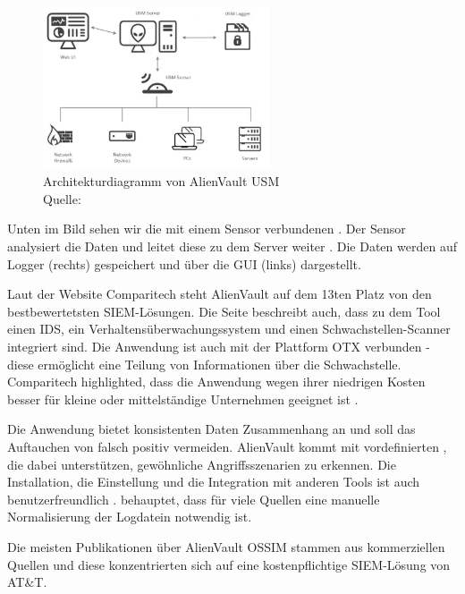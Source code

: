 \begin{figure}[H]
   \centering
   \includegraphics[width=0.6\textwidth]{assets/2_p6.png}
   \caption[Architekturdiagramm von AlienVault \gls{USM}]
   {Architekturdiagramm von AlienVault \gls{USM} \\Quelle: \citep{ATT_AVO} }
   \label{fig:AlienVault_Architektur}
   \centering
\end{figure}

Unten im Bild sehen wir die mit einem Sensor verbundenen . Der Sensor analysiert die Daten und leitet diese zu dem Server weiter \citep{AV_Sensor}. Die Daten werden auf Logger (rechts) gespeichert und über die \gls{GUI} (links) dargestellt. 

Laut der Website Comparitech steht AlienVault auf dem 13ten Platz von den bestbewertetsten \gls{SIEM}-Lösungen. Die Seite beschreibt auch, dass zu dem Tool einen \gls{IDS}, ein Verhaltensüberwachungssystem und einen Schwachstellen-Scanner integriert sind. Die Anwendung ist auch mit der Plattform \gls{OTX} verbunden - diese ermöglicht eine Teilung von Informationen über die Schwachstelle. Comparitech highlighted, dass die Anwendung wegen ihrer niedrigen Kosten besser für kleine oder mittelständige Unternehmen geeignet ist \citep{comparitech_SIEM}. 

Die Anwendung bietet konsistenten Daten Zusammenhang an und soll das Auftauchen von \gls{falsch positiv} vermeiden. AlienVault kommt mit vordefinierten , die dabei unterstützen, gewöhnliche Angriffsszenarien zu erkennen. Die Installation, die Einstellung und die Integration mit anderen Tools ist auch benutzerfreundlich \citep{Gomes_AV}. \citep{Nabil_AV} behauptet, dass für viele Quellen eine manuelle Normalisierung der Logdatein notwendig ist.


Die meisten Publikationen über AlienVault OSSIM stammen aus kommerziellen Quellen und diese konzentrierten sich auf eine kostenpflichtige \gls{SIEM}-Lösung von AT\&T.

